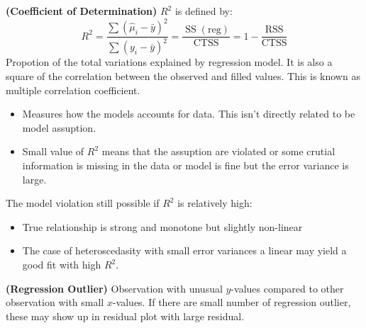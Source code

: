 \begin{definition}{\textbf{(Coefficient of Determination)}}
    $R^2$ is defined by:
    \begin{equation*}
        R^2 = \frac{\sum (\hat{\mu}_i - \bar{y})^2}{\sum (y_i - \bar{y})^2} = \frac{\operatorname{SS}(\text{reg})}{\text{CTSS}} = 1 - \frac{\text{RSS}}{\text{CTSS}}
    \end{equation*}
    Propotion of the total variations explained by regression model. It is also a square of the correlation between the observed and filled values. This is known as multiple correlation coefficient. 
    \begin{itemize}
        \item Measures how the models accounts for data. This isn't directly related to be model assuption. 
        \item Small value of $R^2$ means that the assuption are violated or some crutial information is missing in the data or model is fine but the error variance is large. 
    \end{itemize}
    The model violation still possible if $R^2$ is relatively high:
    \begin{itemize}
        \item True relationship is strong and monotone but slightly non-linear
        \item The case of heteroscedasity with small error variances a linear may yield a good fit with high $R^2$. 
    \end{itemize}
\end{definition}

\begin{definition}{\textbf{(Regression Outlier)}}
    Observation with unusual $y$-values compared to other observation with small $x$-values. If there are small number of regression outlier, these may show up in residual plot with large residual.  
\end{definition}

